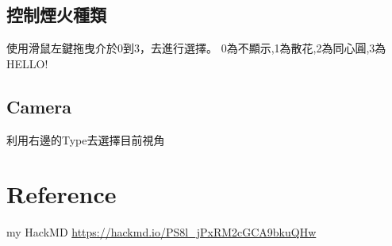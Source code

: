 \documentclass[12pt]{article}
\begin{document}
\begin{CJK*}{UTF8}{bsmi}
	\subsection{控制煙火種類}
	使用滑鼠左鍵拖曳介於0到3，去進行選擇。
	0為不顯示,1為散花,2為同心圓,3為HELLO!
	\subsection{Camera}
	利用右邊的Type去選擇目前視角
\section{Reference}
	my HackMD \url{ https://hackmd.io/PS8l_jPxRM2cGCA9bkuQHw}
\end{CJK*}
\end{document}

